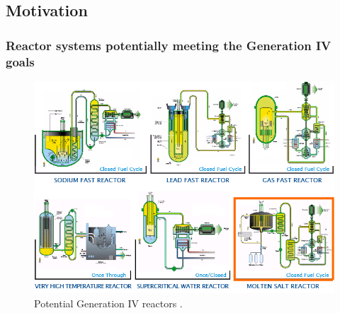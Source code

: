 \subsection{Motivation}

\begin{frame}
  \frametitle{Reactor systems potentially meeting the Generation IV goals}
               \begin{figure}[t]
                \vspace*{-0.1in}
                \includegraphics[height=0.65\textwidth]{./images/6_types.png}
                 \caption{Potential Generation IV reactors \cite{ABRAM2008}.}
               \end{figure}
              
\end{frame}

